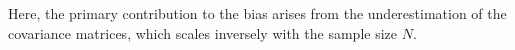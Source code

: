 Here, the primary contribution to the bias arises from the underestimation of the covariance matrices, which scales inversely with the sample size \( N \).








